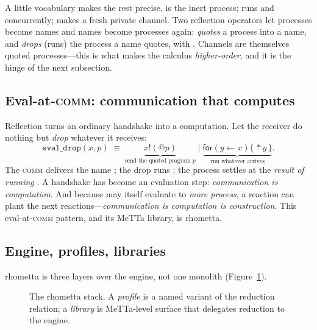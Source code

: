 A little vocabulary makes the rest precise.   is the inert process;
 runs  and  concurrently;  makes a
fresh private channel.  Two reflection operators let processes become names and
names become processes again:  \emph{quotes} a process into a name, and
 \emph{drops} (runs) the process a name quotes, with .
Channels are themselves quoted processes---this is what makes the calculus
\emph{higher-order}, and it is the hinge of the next subsection.

\subsection{Eval-at-\textsc{comm}: communication that computes}

Reflection turns an ordinary handshake into a computation.  Let the receiver do
nothing but \emph{drop} whatever it receives:
\[
  \texttt{eval\_drop}(x,p)\;\equiv\;
  \underbrace{x!(@p)}_{\text{send the quoted program } p}\;\big|\;
  \underbrace{\mathsf{for}(y \leftarrow x)\{\,*y\,\}}_{\text{run whatever arrives}}.
\]
The \textsc{comm} delivers the name ; the drop  runs ;
the process settles at the \emph{result of running} .  A handshake has
become an evaluation step: \emph{communication is computation}.  And because
 may itself evaluate to \emph{more process}, a reaction can plant the
next reactions---\emph{communication is computation is construction}.  This
eval-at-\textsc{comm} pattern, and its MeTTa library, is rhometta.

\subsection{Engine, profiles, libraries}

rhometta is three layers over the engine, not one monolith (Figure~\ref{fig:rho-layers}).

\begin{figure}[h]\centering
{}
\caption{The rhometta stack.  A \emph{profile} is a named variant of the
  reduction relation; a \emph{library} is MeTTa-level surface that delegates
  reduction to the engine.}
\label{fig:rho-layers}
\end{figure}

